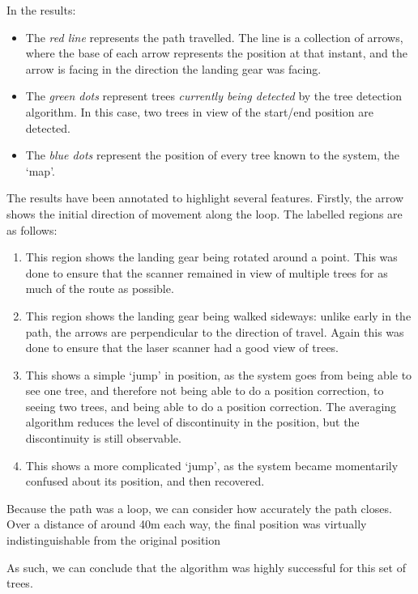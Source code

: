 \documentclass[12pt,oneside,a4paper]{book}
\begin{document}
In the results:
\begin{itemize}
\item The \emph{red line} represents the path travelled. The line is a
  collection of arrows, where the base of each arrow represents the
  position at that instant, and the arrow is facing in the direction
  the landing gear was facing.
\item The \emph{green dots} represent trees \emph{currently being
    detected} by the tree detection algorithm. In this case, two trees
  in view of the start/end position are detected.
\item The \emph{blue dots} represent the position of every tree known
  to the system, the `map'.
\end{itemize}

The results have been annotated to highlight several
features. Firstly, the arrow shows the initial direction of movement
along the loop. The labelled regions are as follows:
\begin{enumerate}[A:]
\item This region shows the landing gear being rotated around a
  point. This was done to ensure that the scanner remained in view of
  multiple trees for as much of the route as possible.
\item This region shows the landing gear being walked sideways: unlike
  early in the path, the arrows are perpendicular to the direction of
  travel. Again this was done to ensure that the laser scanner had a
  good view of trees.
\item This shows a simple `jump' in position, as the system goes from
  being able to see one tree, and therefore not being able to do a
  position correction, to seeing two trees, and being able to do a
  position correction. The averaging algorithm reduces the level of
  discontinuity in the position, but the discontinuity is still
  observable.
\item This shows a more complicated `jump', as the system became
  momentarily confused about its position, and then recovered.
\end{enumerate}

Because the path was a loop, we can consider how accurately the path
closes. Over a distance of around 40m each way, the final position was
virtually indistinguishable from the original position

As such, we can conclude that the algorithm was highly successful for
this set of trees.
\end{document}
